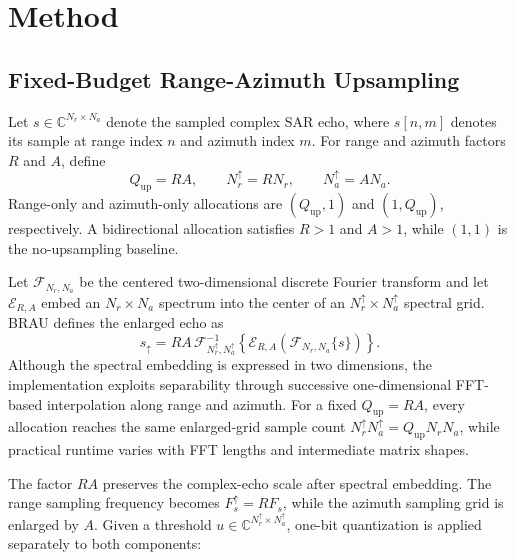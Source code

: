 \documentclass[conference]{IEEEtran}
\begin{document}
\section{Method}

\subsection{Fixed-Budget Range-Azimuth Upsampling}

Let $s\in\mathbb{C}^{N_r\times N_a}$ denote the sampled complex SAR echo, where $s[n,m]$ denotes its sample at range index $n$ and azimuth index $m$. For range and azimuth factors $R$ and $A$, define
\begin{equation}
    Q_{\mathrm{up}}=RA,\qquad
    N_r^{\uparrow}=RN_r,\qquad N_a^{\uparrow}=AN_a.
\end{equation}
Range-only and azimuth-only allocations are $(Q_{\mathrm{up}},1)$ and $(1,Q_{\mathrm{up}})$, respectively. A bidirectional allocation satisfies $R>1$ and $A>1$, while $(1,1)$ is the no-upsampling baseline.

Let $\mathcal{F}_{N_r,N_a}$ be the centered two-dimensional discrete Fourier transform and let $\mathcal{E}_{R,A}$ embed an $N_r\times N_a$ spectrum into the center of an $N_r^{\uparrow}\times N_a^{\uparrow}$ spectral grid. BRAU defines the enlarged echo as
\begin{equation}
    s_{\uparrow}
    =RA\,\mathcal{F}^{-1}_{N_r^{\uparrow},N_a^{\uparrow}}
    \!\left\{\mathcal{E}_{R,A}
    \!\left(\mathcal{F}_{N_r,N_a}\{s\}\right)\right\}.
\end{equation}
Although the spectral embedding is expressed in two dimensions, the implementation exploits separability through successive one-dimensional FFT-based interpolation along range and azimuth. For a fixed $Q_{\mathrm{up}}=RA$, every allocation reaches the same enlarged-grid sample count $N_r^{\uparrow}N_a^{\uparrow}=Q_{\mathrm{up}}N_rN_a$, while practical runtime varies with FFT lengths and intermediate matrix shapes.

The factor $RA$ preserves the complex-echo scale after spectral embedding. The range sampling frequency becomes $F_s^{\uparrow}=RF_s$, while the azimuth sampling grid is enlarged by $A$. Given a threshold $u\in\mathbb{C}^{N_r^{\uparrow}\times N_a^{\uparrow}}$, one-bit quantization is applied separately to both components:
\end{document}
